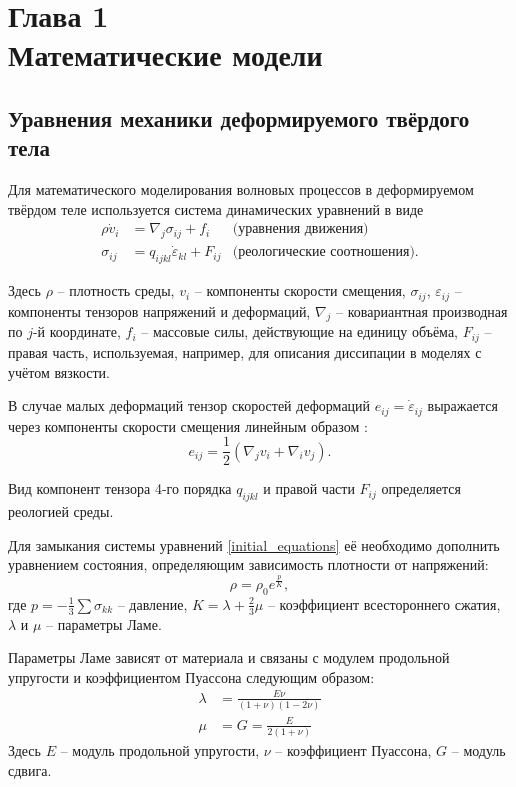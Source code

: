 \section*{Глава 1\\Математические модели}
\setcounter{section}{1}
\setcounter{subsection}{0}

\subsection{Уравнения механики деформируемого твёрдого тела}
Для математического моделирования волновых процессов в деформируемом твёрдом
теле используется система динамических уравнений \cite{novatsky,sedov} в виде
\begin{align}
\label{initial_equations}
\rho\dot{v}_i &= \nabla_j\sigma_{ij}+f_i & \textrm{(уравнения движения)}\nonumber\\
\sigma_{ij} &= q_{ijkl}\dot{\varepsilon}_{kl}+F_{ij} & \textrm{(реологические
соотношения).}
\end{align}

Здесь $\rho$ – плотность среды, $v_i$ – компоненты скорости смещения,
$\sigma_{ij}$, $\varepsilon_{ij}$ -- компоненты тензоров напряжений и деформаций,
$\nabla_j$ – ковариантная производная по $j$-й координате, $f_i$ – массовые
силы, действующие на единицу объёма, $F_{ij}$ -- правая часть, используемая, например, для описания диссипации в моделях с учётом вязкости.

В случае малых деформаций тензор скоростей деформаций $e_{ij}=\dot{\varepsilon}_{ij}$ 
выражается через компоненты скорости смещения линейным образом \cite{landau_lifshits}:
\begin{equation}
e_{ij}=\frac{1}{2}(\nabla_j v_i+\nabla_i v_j).
\end{equation}

Вид компонент тензора 4-го порядка $q_{ijkl}$ и правой части $F_{ij}$ определяется реологией среды.

Для замыкания системы уравнений \eqref{initial_equations} её необходимо дополнить
уравнением состояния, определяющим зависимость плотности от напряжений:
\begin{equation}
\rho=\rho_0e^{\frac{p}{K}},
\end{equation}
где $p=-\frac{1}{3}\sum\sigma_{kk}$ -- давление, $K=\lambda+\frac{2}{3}\mu$ --
коэффициент всестороннего сжатия, $\lambda$ и $\mu$ -- параметры Ламе.

Параметры Ламе зависят от материала и связаны с модулем продольной упругости и коэффициентом Пуассона следующим образом:
\begin{align}
\label{lame_parameters}
\lambda &= \frac{E\nu}{(1+\nu)(1-2\nu)}
\nonumber\\
\mu &= G=\frac{E}{2(1+\nu)}
\end{align}
Здесь $E$ -- модуль продольной упругости, $\nu$ -- коэффициент Пуассона, $G$ -- модуль сдвига.

